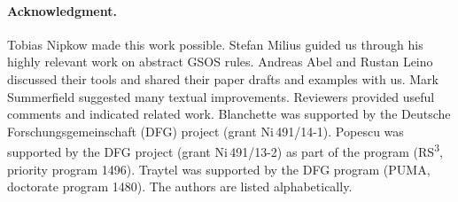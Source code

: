 \documentclass[preprint,draft]
{sigplanconf}
\newcommand{\<}{\langle}
\renewcommand{\>}{\rangle}
\begin{document}
\paragraph{Acknowledgment.}
Tobias Nipkow made this work possible.
Stefan Milius guided us through his highly relevant work on abstract GSOS rules.
Andreas Abel and Rustan Leino discussed their tools and shared
their paper drafts and examples with us.
Mark Summer\-field suggested many textual improvements.
Reviewers provided useful comments and indicated related work.
Blanchette was supported by the Deutsche
Forschungs\-gemein\-schaft (DFG) project  (grant
Ni\,491\slash 14-1).
Popescu was supported by the DFG project
 (grant Ni\allowbreak\,491\slash 13-2) as part
of the program  (RS\textsuperscript{3},
priority program 1496).
Traytel was supported by the DFG program 
(PUMA, doctorate program 1480).
 The authors are listed alphabetically.


\begin{raggedright}
\small

\end{raggedright}
\end{document}
